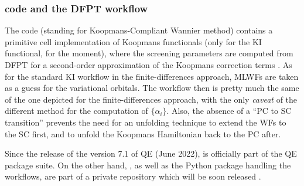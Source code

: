 \subsubsection{\kcw code and the DFPT workflow}
The \kcw code (standing for Koopmans-Compliant Wannier method) contains a primitive cell implementation of Koopmans functionals (only for the KI functional, for the moment), where the screening parameters are computed from DFPT for a second-order approximation of the Koopmans correction terms \cite{colonna_koopmans_2022}. As for the standard KI workflow in the finite-differences approach, MLWFs are taken as a guess for the variational orbitals. The workflow then is pretty much the same of the one depicted for the finite-differences approach, with the only \emph{caveat} of the different method for the computation of $\{ \alpha_i \}$. Also, the absence of a ``PC to SC transition'' prevents the need for an unfolding technique to extend the WFs to the SC first, and to unfold the Koopmans Hamiltonian back to the PC after.

Since the release of the version 7.1 of QE (June 2022), \kcw is officially part of the QE package suite. On the other hand, \kcp, as well as the Python package handling the workflows, are part of a private repository which will be soon released \cite{linscott_koopmans_2022}.


